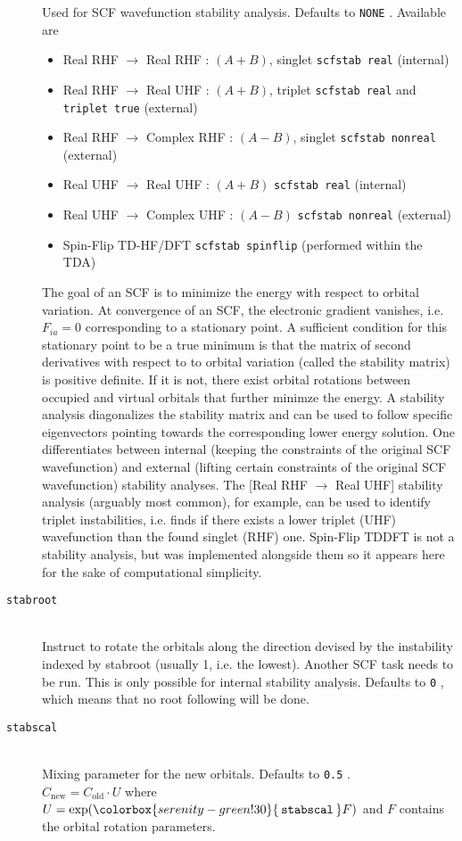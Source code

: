 \documentclass[bibliography=totocnumbered,a4paper,10pt,oneside]{scrbook}
\newcommand{\ttt}[1]{%
  \begingroup\setlength{\fboxsep}{1pt}%
  \colorbox{serenity-green!30}{\texttt{\hspace*{2pt}\vphantom{(g}#1\hspace*{2pt}}}%
  \endgroup
}
\begin{document}
\begin{description}
    Used for SCF wavefunction stability analysis. Defaults to \ttt{NONE}. Available are
    \begin{itemize}
      \item Real RHF $\rightarrow$ Real RHF    : $(A+B)$, singlet \ttt{scfstab real} (internal)
      \item Real RHF $\rightarrow$ Real UHF    : $(A+B)$, triplet \ttt{scfstab real} and \ttt{triplet true} (external)
      \item Real RHF $\rightarrow$ Complex RHF : $(A-B)$, singlet \ttt{scfstab nonreal} (external)
      \item Real UHF $\rightarrow$ Real UHF    : $(A+B)$ \ttt{scfstab real} (internal)
      \item Real UHF $\rightarrow$ Complex UHF : $(A-B)$ \ttt{scfstab nonreal} (external)
      \item Spin-Flip TD-HF/DFT \ttt{scfstab spinflip} (performed within the TDA)
    \end{itemize}
    The goal of an SCF is to minimize the energy with respect to orbital variation. At convergence of an SCF, the electronic gradient vanishes,
    i.e. $F_{ia} = 0$ corresponding to a stationary point. A sufficient condition for this stationary point to be a true minimum is that the matrix of 
    second derivatives with respect to to orbital variation (called the stability matrix) is positive definite. If it is not, there exist orbital rotations
    between occupied and virtual orbitals that further minimze the energy. A stability analysis diagonalizes the stability matrix and can be used
    to follow specific eigenvectors pointing towards the corresponding lower energy solution.
    One differentiates between internal (keeping the constraints of the original SCF wavefunction) and external (lifting certain constraints of the original SCF wavefunction) stability analyses.
    The [Real RHF $\rightarrow$ Real UHF] stability analysis (arguably most common), for example, can be used to identify triplet instabilities, i.e. finds
    if there exists a lower triplet (UHF) wavefunction than the found singlet (RHF) one. Spin-Flip TDDFT is not a stability analysis, but was
    implemented alongside them so it appears here for the sake of computational simplicity.
    \item [\texttt{stabroot}]\hfill \\
    Instruct to rotate the orbitals along the direction devised by the instability indexed by stabroot (usually 1, i.e. the lowest). 
    Another SCF task needs to be run. This is only possible for internal stability analysis.
    Defaults to \ttt{0}, which means that no root following will be done.
    \item [\texttt{stabscal}]\hfill \\
    Mixing parameter for the new orbitals. Defaults to \ttt{0.5}.\\
    $C_\mathrm{new} = C_\mathrm{old} \cdot U $ where $U=\mathrm{exp}(\ttt{stabscal} F)$ and $F$ contains the orbital rotation parameters.
    \end{description}
\end{document}

